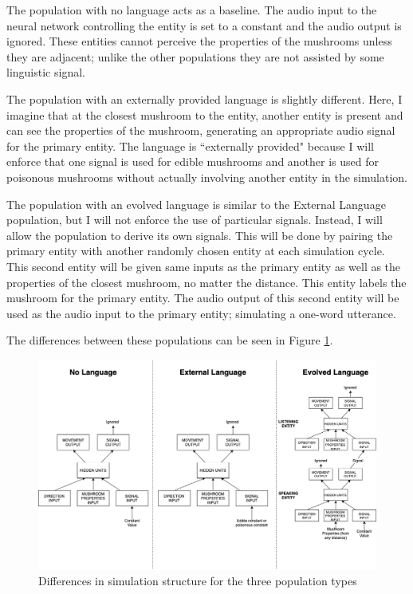 \documentclass[12pt,a4paper,twoside,openright]{report}
\begin{document}
The population with no language acts as a baseline. The audio input to the neural network controlling the entity is set to a constant and the audio output is ignored. These entities cannot perceive the properties of the mushrooms unless they are adjacent; unlike the other populations they are not assisted by some linguistic signal.

The population with an externally provided language is slightly different. Here, I imagine that at the closest mushroom to the entity, another entity is present and can see the properties of the mushroom, generating an appropriate audio signal for the primary entity. The language is ``externally provided" because I will enforce that one signal is used for edible mushrooms and another is used for poisonous mushrooms without actually involving another entity in the simulation. 

The population with an evolved language is similar to the External Language population, but I will not enforce the use of particular signals. Instead, I will allow the population to derive its own signals. This will be done by pairing the primary entity with another randomly chosen entity at each simulation cycle. This second entity will be given same inputs as the primary entity as well as the properties of the closest mushroom, no matter the distance. This entity labels the mushroom for the primary entity. The audio output of this second entity will be used as the audio input to the primary entity; simulating a one-word utterance.

The differences between these populations can be seen in Figure \ref{fig:populations}.

\begin{figure}[t]
  \centering
  \includegraphics[width=.9\linewidth]{figs/populations}
  \caption{Differences in simulation structure for the three population types}
  \label{fig:populations}
\end{figure}
\end{document}
